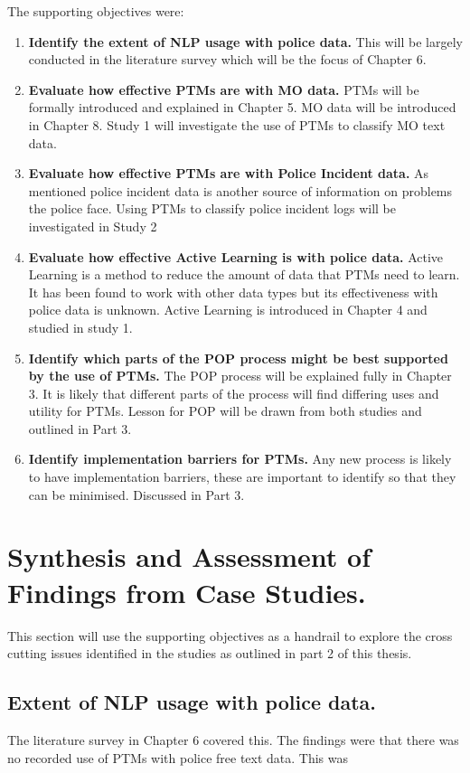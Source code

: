 The supporting objectives were:
\begin{enumerate}
\item {\bf Identify the extent of NLP usage with police data.} This will be largely conducted in the literature survey which will be the focus of Chapter 6.

\item {\bf Evaluate how effective PTMs are with MO data.} PTMs will be formally introduced and explained in Chapter 5. MO data will be introduced in Chapter 8. Study 1 will investigate the use of PTMs to classify MO text data.

\item {\bf Evaluate how effective PTMs are with Police Incident data.} As mentioned police incident data is another source of information on problems the police face. Using PTMs to classify police incident logs will be investigated in Study 2 

\item {\bf Evaluate how effective Active Learning is with police data.}  Active Learning is a method to reduce the amount of data that PTMs need to learn. It has been found to work with other data types but its effectiveness with police data is unknown. Active Learning is introduced in Chapter 4 and studied in study 1.

\item {\bf Identify which parts of the POP process might be best supported by the use of PTMs.} The POP process will be explained fully in Chapter 3. It is likely that different parts of the process will find differing uses and utility for PTMs. Lesson for POP will be drawn from both studies and outlined in Part 3. 

\item {\bf Identify implementation barriers for PTMs.} Any new process is likely to have implementation barriers, these are important to identify so that they can be minimised. Discussed in Part 3. 

\end{enumerate}

\section{Synthesis and Assessment of Findings from Case Studies.} This section will use the supporting objectives as a handrail to explore the cross cutting issues identified in the studies as outlined in part 2 of this thesis.

\subsection{Extent of NLP usage with police data.} The literature survey in Chapter 6 covered this. The findings were that there was no recorded use of PTMs with police free text data. This was 



